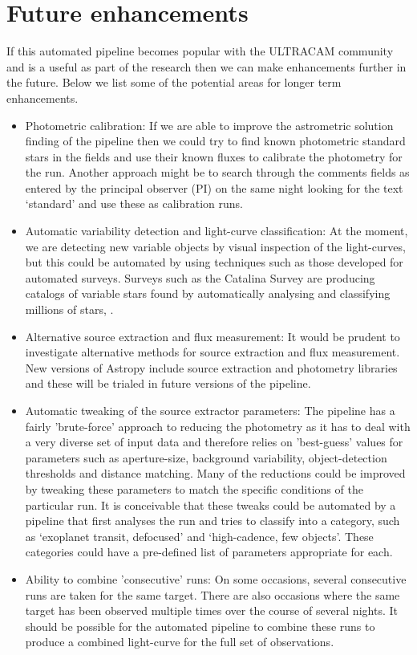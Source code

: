 \section{Future enhancements}
If this automated pipeline becomes popular with the ULTRACAM community and is a useful as part of the research then we can make enhancements further in the future. Below we list some of the potential areas for longer term enhancements.
\begin{itemize}
	\item{Photometric calibration}: If we are able to improve the astrometric solution finding of the pipeline then we could try to find known photometric standard stars in the fields and use their known fluxes to calibrate the photometry for the run. Another approach might be to search through the comments fields as entered by the principal observer (PI) on the same night looking for the text `standard' and use these as calibration runs. 
	\item{Automatic variability detection and light-curve classification}: At the moment, we are detecting new variable objects by visual inspection of the light-curves, but this could be automated by using techniques such as those developed for automated surveys. Surveys such as the Catalina Survey are producing catalogs of variable stars found by automatically analysing and classifying millions of stars, \citep{CatalinaCatalog}.
	\item{Alternative source extraction and flux measurement}: It would be prudent to investigate alternative methods for source extraction and flux measurement. New versions of Astropy include source extraction and photometry libraries and these will be trialed in future versions of the pipeline. 
	\item{Automatic tweaking of the source extractor parameters}: The pipeline has a fairly 'brute-force' approach to reducing the photometry as it has to deal with a very diverse set of input data and therefore relies on 'best-guess' values for parameters such as aperture-size, background variability, object-detection thresholds and distance matching. Many of the reductions could be improved by tweaking these parameters to match the specific conditions of the particular run. It is conceivable that these tweaks could be automated by a pipeline that first analyses the run and tries to classify into a category, such as `exoplanet transit, defocused' and `high-cadence, few objects'. These categories could have a pre-defined list of parameters appropriate for each. 
	\item{Ability to combine 'consecutive' runs}: On some occasions, several consecutive runs are taken for the same target. There are also occasions where the same target has been observed multiple times over the course of several nights. It should be possible for the automated pipeline to combine these runs to produce a combined light-curve for the full set of observations. 
\end{itemize} 
 
